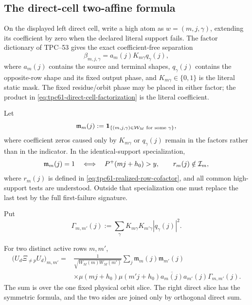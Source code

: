 \subsection{The direct-cell two-affine formula}

On the displayed left direct cell, write a high atom as
\(w=(m,j,\gamma)\), extending its coefficient by zero when the declared
literal support fails.  The factor dictionary of TPC--53 gives the exact
coefficient-free separation
\begin{equation}
 \beta_{m,j,\gamma}
 =a_m(j)K_{m\gamma}q_\gamma(j),
 \label{eq:tpc61-direct-cell-factorization}
\end{equation}
where \(a_m(j)\) contains the source and terminal shapes,
\(q_\gamma(j)\) contains the opposite-row shape and its fixed output
phase, and \(K_{m\gamma}\in\{0,1\}\) is the literal static mask.  The
fixed residue/orbit phase may be placed in either factor; the product in
\eqref{eq:tpc61-direct-cell-factorization} is the literal coefficient.

Let
\begin{equation}
 \mathfrak m_m(j)
 :=\mathbf 1_{\{(m,j,\gamma)\in\mathcal W_M
                 \text{ for some }\gamma\}},
 \label{eq:tpc61-missing-time-indicator}
\end{equation}
where coefficient zeros caused only by \(K_{m\gamma}\) or
\(q_\gamma(j)\) remain in the factors rather than in the indicator.  In
the identical-support specialization,
\begin{equation}
 \mathfrak m_m(j)=1
 \quad\Longleftrightarrow\quad
 P^{+}(mj+h_0)>y,
 \qquad
 r_m(j)\notin\mathcal I_m,
 \label{eq:tpc61-missing-time-cofactor-test}
\end{equation}
where \(r_m(j)\) is defined in
\eqref{eq:tpc61-realized-row-cofactor}, and all common high-support tests
are understood.  Outside that specialization
one must replace the last test by the full first-failure signature.

Put
\begin{equation}
 \Gamma_{m,m'}(j)
 :=\sum_\gamma
 K_{m\gamma}K_{m'\gamma}|q_\gamma(j)|^2.
 \label{eq:tpc61-two-row-output-overlap}
\end{equation}

\begin{corollary}
\label{cor:tpc61-two-affine-mobius-kernel}
For two distinct active rows \(m,m'\),
\begin{equation}
 \boxed{
 \begin{aligned}
 \bigl(U_d\Xi_{\ne p}U_d\bigr)_{m,m'}
 ={}&\frac{1}{\sqrt{W_M(m)W_M(m')}}
 \sum_j
 \mathfrak m_m(j)\mathfrak m_{m'}(j)\\
 &\times
 \mu(mj+h_0)\mu(m'j+h_0)
 \overline{a_m(j)}a_{m'}(j)
 \Gamma_{m,m'}(j).
 \end{aligned}}
 \label{eq:tpc61-two-affine-mobius-kernel}
\end{equation}
The sum is over the one fixed physical orbit slice.  The right direct slice
has the symmetric formula, and the two sides are joined only by orthogonal
direct sum.
\end{corollary}


